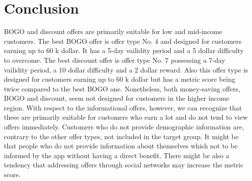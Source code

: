 \documentclass[11pt]{article} %
\begin{document}
\section{Conclusion}
BOGO and discount offers are primarily suitable for low and mid-income customers. The best BOGO offer is offer type No. 4 and designed for customers earning up to 60 k dollar.
It has a  5-day vailidity period and a 5 dollar difficulty to overcome. 
The best discount offer is offer type No. 7 possessing a 7-day vailidity period, a 10 dollar difficulty and a 2 dollar reward.
Also this offer type is designed for customers earning up to 60 k dollar but has a metric score being twice compared to the best BOGO one.
Nonetheless, both money-saving offers, BOGO and discount, seem not designed for customers in the higher income region.
With respect to the informational offers, however,  we can recognize that these are primarily suitable for customers who earn a lot and do not tend to view offers immediately.
Customers who do not provide demographic information are, contrary to the other offer types, not included in the target group.
It might be that people who do not provide information about themselves whish not to be informed by the app without having a direct benefit.
There might be also a tendency that addressing offers through social networks may increase the metric score.
\end{document}
